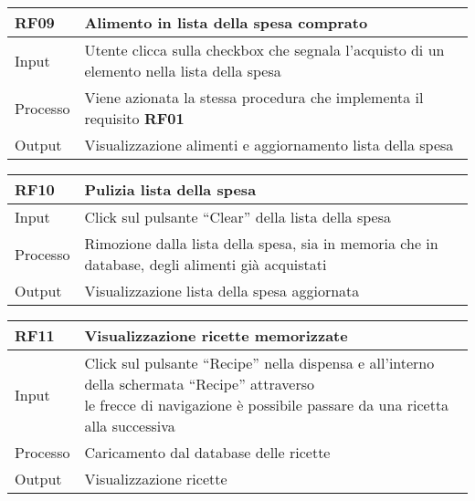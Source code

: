 \begin{table}[H]
    \begin{flushleft}
      \begin{tabular}{l|l}
        \toprule
        \textbf{RF09} & \textbf{Alimento in lista della spesa comprato}\\
        \midrule
        Input & Utente clicca sulla checkbox che segnala l’acquisto di un elemento nella lista della spesa\\
        Processo & Viene azionata la stessa procedura che implementa il requisito \textbf{RF01}\\
        Output & Visualizzazione alimenti e aggiornamento lista della spesa\\
        \bottomrule
      \end{tabular}
    \end{flushleft}
\end{table}

\begin{table}[H]
    \begin{flushleft}
      \begin{tabular}{l|l}
        \toprule
        \textbf{RF10} & \textbf{Pulizia lista della spesa}\\
        \midrule
        Input & Click sul pulsante “Clear” della lista della spesa\\
        Processo & Rimozione dalla lista della spesa, sia in memoria che in database, degli alimenti già acquistati\\
        Output & Visualizzazione lista della spesa aggiornata\\
        \bottomrule
      \end{tabular}
    \end{flushleft}
\end{table}

\begin{table}[H]
    \begin{flushleft}
      \begin{tabular}{l|l}
        \toprule
        \textbf{RF11} & \textbf{Visualizzazione ricette memorizzate}\\
        \midrule
        Input & \makecell{Click sul pulsante “Recipe” nella dispensa e all’interno della schermata “Recipe” attraverso \\ le frecce di navigazione è possibile passare da una ricetta alla successiva}\\
        Processo & Caricamento dal database delle ricette\\
        Output & Visualizzazione ricette\\
        \bottomrule
      \end{tabular}
    \end{flushleft}
\end{table}

